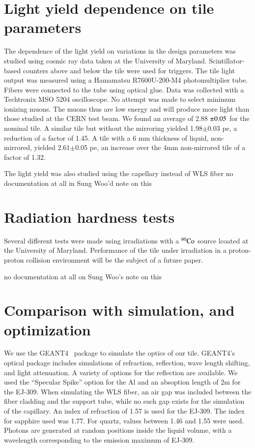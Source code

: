 \documentclass[review]{elsarticle}
\begin{document}
\section{Light yield dependence on tile parameters}

The dependence of the light yield on variations in the design parameters was studied using cosmic ray data taken at the University of Maryland.  Scintillator-based counters above and below the tile were used for triggers.  The tile light output was measured using a Hamamatsu R7600U-200-M4 photomultiplier tube.  Fibers were connected to the tube using optical glue.  Data was collected with a Techtronix MSO 5204 oscilloscope.  No attempt was made to select
minimum ionizing muons.  The muons thus are low energy and will produce more light than those studied at the CERN test beam.  We found an average of 2.88 ${\rm \pm } 0.05$ for the nominal tile.  A similar tile but without the mirroring yielded 1.98${\pm} 0.03$ pe, a reduction of a factor of 1.45.  A tile with a 6 mm thickness of liquid, non-mirrored, yielded 2.61${\pm }$0.05 pe, an increase over the 4mm non-mirrored tile of a factor of 1.32.

The light yield was also studied using the capellary instead of WLS fiber {\color{red} no documentation at all in Sung Woo'd note on this}

\section{Radiation hardness tests}

Several different tests were made using irradiations with a $\rm{^{60}Co}$ source lcoated at the University of Maryland.  Performance of the tile under irradiation in a proton-proton collision environment will be the subject of a future paper.


{\color{red} no documentation at all on Sung Woo's note on this}

\section{Comparison with simulation, and optimization}
We use the GEANT4~\cite{Agostinelli2003250} package to simulate the optics of our tile.  GEANT4's optical package includes simulations of refraction, reflection, wave length shifting, and light attenuation.  A variety of options for the reflection are available.  We used the ``Specular Spike'' option for the Al and an absoption length of 2m for the EJ-309.  When simulating the WLS fiber, an air gap was included between the fiber cladding and the support tube, while no such gap exists for the simulation of the capillary. An index of refraction of 1.57 is used for the EJ-309.  The index for sapphire used was 1.77.  For quartz, values between 1.46 and 1.55 were used.
Photons are generated at random positions inside the liquid volume, with a wavelength corresponding to the emission maximum of EJ-309.  
\end{document}
